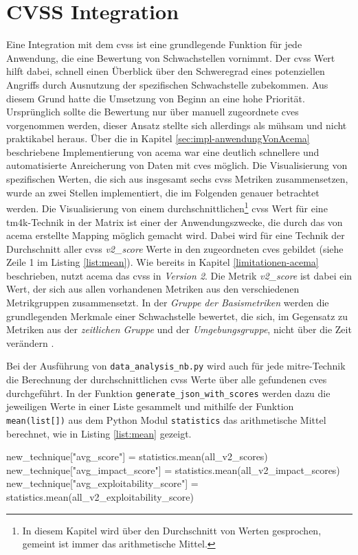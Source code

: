 \section{CVSS Integration} 
\label{sec:impl-cvssIntegration}
Eine Integration mit dem \gls{cvss} ist eine grundlegende Funktion für jede Anwendung, die eine Bewertung von Schwachstellen vornimmt. Der \gls{cvss} Wert hilft dabei, schnell einen Überblick über den Schweregrad eines potenziellen Angriffs durch Ausnutzung der spezifischen Schwachstelle zubekommen. Aus diesem Grund hatte die Umsetzung von Beginn an eine hohe Priorität. Ursprünglich sollte die Bewertung nur über manuell zugeordnete \glspl{cve} vorgenommen werden, dieser Ansatz stellte sich allerdings als mühsam und nicht praktikabel heraus. Über die in Kapitel \ref{sec:impl-anwendungVonAcema} beschriebene Implementierung von \gls{acema} war eine deutlich schnellere und automatisierte Anreicherung von Daten mit \glspl{cve} möglich. Die Visualisierung von spezifischen Werten, die sich aus insgesamt sechs \gls{cvss} Metriken zusammensetzen, wurde an zwei Stellen implementiert, die im Folgenden genauer betrachtet werden.
Die Visualisierung von einem durchschnittlichen\footnote{In diesem Kapitel wird über den Durchschnitt von Werten gesprochen, gemeint ist immer das arithmetische Mittel.} \gls{cvss} Wert für eine \gls{tm4k}-Technik in der Matrix ist einer der Anwendungszwecke, die durch das von \gls{acema} erstellte Mapping möglich gemacht wird. Dabei wird für eine Technik der Durchschnitt aller \gls{cvss} \textit{v2\_score} Werte in den zugeordneten \glspl{cve} gebildet (siehe Zeile 1 im Listing \ref{list:mean}).  Wie bereits in Kapitel \ref{limitationen-acema} beschrieben, nutzt \gls{acema} das \gls{cvss} in \textit{Version 2}. Die Metrik \textit{v2\_score} ist dabei ein Wert, der sich aus allen vorhandenen Metriken aus den verschiedenen Metrikgruppen zusammensetzt. In der \textit{Gruppe der Basismetriken} werden die grundlegenden Merkmale einer Schwachstelle bewertet, die sich, im Gegensatz zu Metriken aus der \textit{zeitlichen Gruppe} und der \textit{Umgebungsgruppe}, nicht über die Zeit verändern \autocite{CVSSV2Complete}.

Bei der Ausführung von \verb|data_analysis_nb.py| wird auch für jede \gls{mitre}-Technik die Berechnung der durchschnittlichen \gls{cvss} Werte über alle gefundenen \glspl{cve} durchgeführt. In der Funktion \verb|generate_json_with_scores| werden dazu die jeweiligen Werte in einer Liste gesammelt und mithilfe der Funktion \verb|mean(list[])| aus dem Python Modul \verb|statistics| das arithmetische Mittel berechnet, wie in Listing \ref{list:mean} gezeigt.
\begin{code}[caption=Berechnung des arithmetischen Mittels aus den CVSS Metriken mehrerer CVEs]
    new_technique["avg_score"] = statistics.mean(all_v2_scores)
    new_technique["avg_impact_score"] = statistics.mean(all_v2_impact_scores)
    new_technique["avg_exploitability_score"] = statistics.mean(all_v2_exploitability_score)
\end{code}
\label{list:mean}

